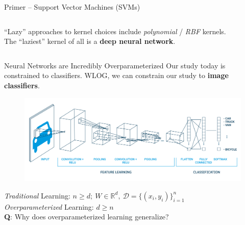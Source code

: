 \documentclass{beamer}
\begin{document}
\begin{frame}{Primer -- Support Vector Machines (SVMs)}
\begin{columns}
\begin{column}{.5\textwidth}
\begin{center}
			\end{center} \pause
			``Lazy'' approaches to kernel choices include \textit{polynomial} / \textit{RBF} kernels. \pause \newline \\

			The ``laziest'' kernel of all is a \textbf{deep neural network}.
		\end{column}
	\end{columns}
\end{frame}

\begin{frame}{Neural Networks are Incredibly Overparameterized}
	Our study today is constrained to classifiers. \pause WLOG, we can constrain our study to \textbf{image classifiers}.
	\begin{figure}[H]
		\centering
		\includegraphics[width=\textwidth]{img/cnn.png}
	\end{figure} \pause

	\vspace{-1em}

	\textit{Traditional} Learning: $n \geq d;\ W \in \mathbb{R}^d,\ \mathcal{D} = \{(x_i, y_i)\}^n_{i=1}$ \pause \\
	\textit{Overparameterized} Learning: $d \geq n$ \pause \newline \\

	\textbf{Q}: Why does overparameterized learning generalize?
\end{frame}
\end{document}
